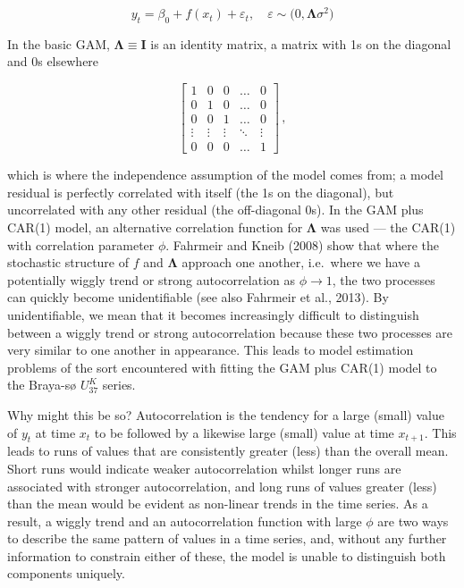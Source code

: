 \documentclass[12pt,]{article}
\newcommand{\uk}{\ensuremath{\mathit{U}^{\mathit{K}}_{\mathup{37}}}}
\begin{document}
\begin{equation}
y_t = \beta_0 + f(x_t) + \varepsilon_t, \quad \varepsilon \sim \mathcal(0, \boldsymbol{\Lambda}\sigma^2)
\end{equation}

In the basic GAM, \(\boldsymbol{\Lambda} \equiv \mathbf{I}\) is an
identity matrix, a matrix with 1s on the diagonal and 0s elsewhere

\begin{equation*}
\begin{bmatrix}
1      & 0 & 0 & \dots & 0 \\
0      & 1 & 0 & \dots & 0 \\
0      & 0 & 1 & \dots & 0 \\
\vdots & \vdots & \vdots & \ddots & \vdots \\
0      & 0 & 0 & \dots & 1
\end{bmatrix}\, ,
\end{equation*}

which is where the independence assumption of the model comes from; a
model residual is perfectly correlated with itself (the 1s on the
diagonal), but uncorrelated with any other residual (the off-diagonal
0s). In the GAM plus CAR(1) model, an alternative correlation function
for \(\boldsymbol{\Lambda}\) was used --- the CAR(1) with correlation
parameter \(\phi\). Fahrmeir and Kneib (2008) show that where the
stochastic structure of \(f\) and \(\boldsymbol{\Lambda}\) approach one
another, i.e.~where we have a potentially wiggly trend or strong
autocorrelation as \(\phi \rightarrow 1\), the two processes can quickly
become unidentifiable (see also Fahrmeir et al., 2013). By
unidentifiable, we mean that it becomes increasingly difficult to
distinguish between a wiggly trend or strong autocorrelation because
these two processes are very similar to one another in appearance. This
leads to model estimation problems of the sort encountered with fitting
the GAM plus CAR(1) model to the Braya-sø \uk{} series.

Why might this be so? Autocorrelation is the tendency for a large
(small) value of \(y_t\) at time \(x_t\) to be followed by a likewise
large (small) value at time \(x_{t+1}\). This leads to runs of values
that are consistently greater (less) than the overall mean. Short runs
would indicate weaker autocorrelation whilst longer runs are associated
with stronger autocorrelation, and long runs of values greater (less)
than the mean would be evident as non-linear trends in the time series.
As a result, a wiggly trend and an autocorrelation function with large
\(\phi\) are two ways to describe the same pattern of values in a time
series, and, without any further information to constrain either of
these, the model is unable to distinguish both components uniquely.
\end{document}
